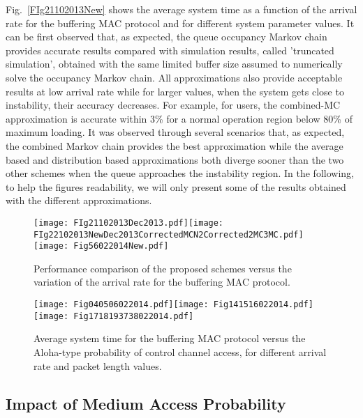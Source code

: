 \documentclass[12pt,journal,oneside,onecolumn]{IEEEtran}
\begin{document}
Fig.~\ref{FIg21102013New} shows the average system time as a
function of the arrival rate for the buffering MAC protocol and for different system parameter values. 
It can be first observed that, as expected, the queue occupancy Markov chain 
provides accurate results compared with simulation results, called 'truncated simulation', obtained
with the same limited buffer size assumed to numerically solve the occupancy Markov chain. 
All approximations also provide acceptable results at low arrival rate while for larger values, when
the system gets close to instability, their accuracy decreases. 
For example, for  users, the combined-MC approximation is accurate within 3\% for a normal operation region
below 80\% of maximum loading. It was observed through several scenarios that, as expected, the combined Markov chain
provides the best approximation while the average based and distribution based approximations both diverge sooner 
than the two other schemes when the queue approaches the instability region.
In the following, to help the figures readability, we will only present some of the results obtained with the different approximations.
\begin{figure*}\texttt{[image: FIg21102013Dec2013.pdf]}\texttt{[image: FIg22102013NewDec2013CorrectedMCN2Corrected2MC3MC.pdf]} 
\texttt{[image: Fig56022014New.pdf]}
\caption{Performance comparison of the proposed schemes versus the variation of the arrival rate for the buffering MAC protocol.}
\label{FIg21102013New}\vspace{1em}
\texttt{[image: Fig040506022014.pdf]}\texttt{[image: Fig141516022014.pdf]}\\\texttt{[image: Fig1718193738022014.pdf]}\caption{Average system time for the buffering MAC protocol versus the Aloha-type probability of control channel access, for different arrival rate and packet length values.}\label{FigPVariable3LambdasOnlySim}\end{figure*}


\subsection{Impact of Medium Access Probability}
\end{document}
